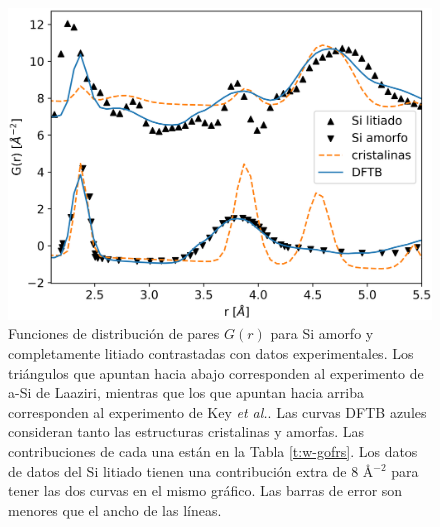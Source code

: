 \begin{figure}[h!]
    \centering
    \includegraphics[width=.7\textwidth]{Silicio/prediccion/resultados/xray/pdfs.png}
    \caption{Funciones de distribución de pares $G(r)$ para Si amorfo y 
    completamente litiado contrastadas con datos experimentales. Los triángulos 
    que apuntan hacia abajo corresponden al experimento de a-Si de Laaziri, 
    mientras que los que apuntan hacia arriba corresponden al experimento de 
    Key \textit{et al.}. Las curvas DFTB azules consideran tanto las estructuras 
    cristalinas y amorfas. Las contribuciones de cada una están en la Tabla 
    \ref{t:w-gofrs}. Los datos de datos del Si litiado tienen una contribución 
    extra de 8 \AA$^{-2}$ para tener las dos curvas en el mismo gráfico. 
    Las barras de error son menores que el ancho de las líneas.}
    \label{fig:pdfs}
\end{figure}

